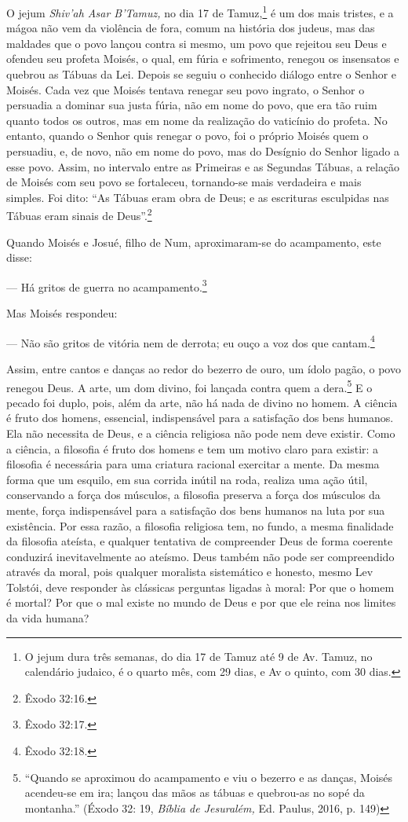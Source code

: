 O jejum \emph{Shiv'ah Asar B'Tamuz,} no dia 17 de Tamuz,\footnote{O
  jejum dura três semanas, do dia 17 de Tamuz até 9 de Av. Tamuz, no
  calendário judaico, é o quarto mês, com 29 dias, e Av o quinto, com 30
  dias.} é um dos mais tristes, e a mágoa não vem da violência de fora,
comum na história dos judeus, mas das maldades que o povo lançou contra
si mesmo, um povo que rejeitou seu Deus e ofendeu seu profeta Moisés, o
qual, em fúria e sofrimento, renegou os insensatos e quebrou as Tábuas
da Lei. Depois se seguiu o conhecido diálogo entre o Senhor e Moisés.
Cada vez que Moisés tentava renegar seu povo ingrato, o Senhor o
persuadia a dominar sua justa fúria, não em nome do povo, que era tão
ruim quanto todos os outros, mas em nome da realização do vaticínio do
profeta. No entanto, quando o Senhor quis renegar o povo, foi o próprio
Moisés quem o persuadiu, e, de novo, não em nome do povo, mas do
Desígnio do Senhor ligado a esse povo. Assim, no intervalo entre as
Primeiras e as Segundas Tábuas, a relação de Moisés com seu povo se
fortaleceu, tornando-se mais verdadeira e mais simples. Foi dito: ``As
Tábuas eram obra de Deus; e as escrituras esculpidas nas Tábuas eram
sinais de Deus''.\footnote{Êxodo 32:16.}

Quando Moisés e Josué, filho de Num, aproximaram-se do acampamento, este
disse:

--- Há gritos de guerra no acampamento.\footnote{Êxodo 32:17.}

Mas Moisés respondeu:

--- Não são gritos de vitória nem de derrota; eu ouço a voz dos que
cantam.\footnote{Êxodo 32:18.}

Assim, entre cantos e danças ao redor do bezerro de ouro, um ídolo
pagão, o povo renegou Deus. A arte, um dom divino, foi lançada contra
quem a dera.\footnote{``Quando se aproximou do acampamento e viu o
  bezerro e as danças, Moisés acendeu-se em ira; lançou das mãos as
  tábuas e quebrou-as no sopé da montanha.'' (Éxodo 32: 19, \emph{Bíblia
  de Jesuralém,} Ed. Paulus, 2016, p. 149)} E o pecado foi duplo, pois,
além da arte, não há nada de divino no homem. A ciência é fruto dos
homens, essencial, indispensável para a satisfação dos bens humanos. Ela
não necessita de Deus, e a ciência religiosa não pode nem deve existir.
Como a ciência, a filosofia é fruto dos homens e tem um motivo claro
para existir: a filosofia é necessária para uma criatura racional
exercitar a mente. Da mesma forma que um esquilo, em sua corrida inútil
na roda, realiza uma ação útil, conservando a força dos músculos, a
filosofia preserva a força dos músculos da mente, força indispensável
para a satisfação dos bens humanos na luta por sua existência. Por essa
razão, a filosofia religiosa tem, no fundo, a mesma finalidade da
filosofia ateísta, e qualquer tentativa de compreender Deus de forma
coerente conduzirá inevitavelmente ao ateísmo. Deus também não pode ser
compreendido através da moral, pois qualquer moralista sistemático e
honesto, mesmo Lev Tolstói, deve responder às clássicas perguntas
ligadas à moral: Por que o homem é mortal? Por que o mal existe no mundo
de Deus e por que ele reina nos limites da vida humana?

